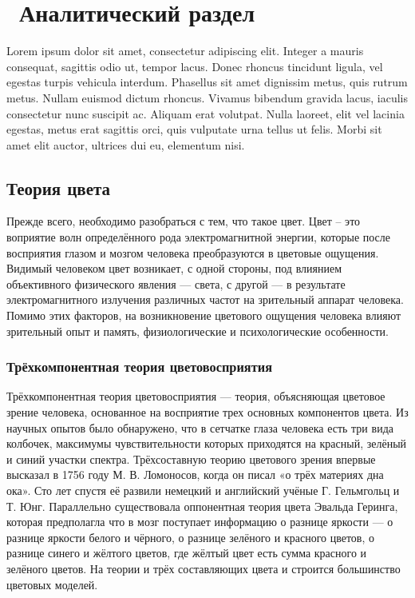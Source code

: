 \chapter{ Аналитический раздел}
\label{cha:analysis}
%
%
Lorem ipsum dolor sit amet, consectetur adipiscing elit. Integer a mauris consequat, sagittis odio ut, tempor lacus. Donec rhoncus tincidunt ligula, vel egestas turpis vehicula interdum. Phasellus sit amet dignissim metus, quis rutrum metus. Nullam euismod dictum rhoncus. Vivamus bibendum gravida lacus, iaculis consectetur nunc suscipit ac. Aliquam erat volutpat. Nulla laoreet, elit vel lacinia egestas, metus erat sagittis orci, quis vulputate urna tellus ut felis. Morbi sit amet elit auctor, ultrices dui eu, elementum nisi.




\section{Теория цвета}
Прежде всего, необходимо разобраться с тем, что такое цвет. Цвет -- это воприятие волн определённого рода электромагнитной энергии, которые после восприятия глазом и мозгом человека преобразуются в цветовые ощущения. Видимый человеком цвет возникает, с одной стороны, под влиянием объективного физического явления — света, с другой — в результате электромагнитного излучения различных частот на зрительный аппарат человека. Помимо этих факторов, на возникновение цветового ощущения человека влияют зрительный опыт и память, физиологические и психологические особенности.

\subsection{Трёхкомпонентная теория цветовосприятия}
Трёхкомпонентная теория цветовосприятия — теория, объясняющая цветовое зрение человека, основанное на восприятие трех основных компонентов цвета. Из научных опытов было обнаружено, что в сетчатке глаза человека есть три вида колбочек, максимумы чувствительности которых приходятся на красный, зелёный и синий участки спектра. \cite{b1}  Трёхсоставную теорию цветового зрения впервые высказал в 1756 году М. В. Ломоносов, когда он писал «о трёх материях дна ока». Сто лет спустя её развили немецкий и английский учёные Г. Гельмгольц и Т. Юнг. Параллельно существовала оппонентная теория цвета Эвальда Геринга, которая предполагла что в мозг поступает информацию о разнице яркости — о разнице яркости белого и чёрного, о разнице зелёного и красного цветов, о разнице синего и жёлтого цветов, где жёлтый цвет есть сумма красного и зелёного цветов.  На теории и трёх составляющих цвета и строится большинство цветовых моделей. 

